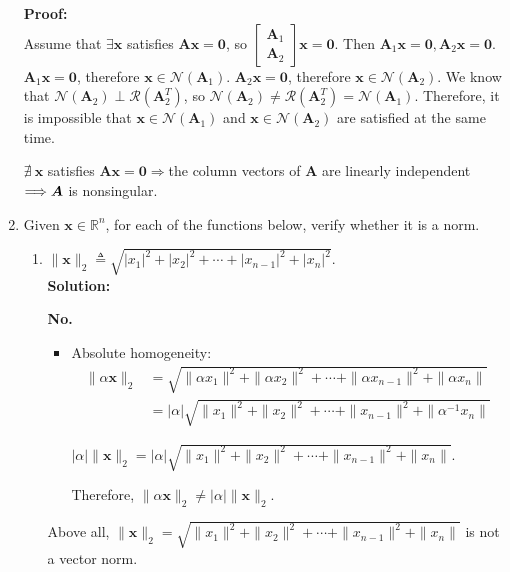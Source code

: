 \documentclass[12pt, letterpaper, onecolumn]{article}
\begin{document}
\begin{enumerate}[start=2]
		\textbf{Proof:}\\
		Assume that $\exists\bm{x}$ satisfies $\bm{A}\bm{x}=\bm{0}$, so 
		$\begin{bmatrix}
            \bm{A}_{1} \\ \bm{A}_{2}
		\end{bmatrix} \bm{x}=\bm{0}$.
		Then $\bm{A}_{1}\bm{x}=\bm{0},\bm{A}_{2}\bm{x}=\bm{0}$.
		$\bm{A}_{1}\bm{x}=\bm{0} $, therefore $\bm{x}\in\mathcal{N}(\bm{A}_{1})$. $\bm{A}_{2}\bm{x}=\bm{0} $, therefore $\bm{x}\in\mathcal{N}(\bm{A}_{2})$. We know that $\mathcal{N}(\bm{A}_{2}) \perp \mathcal{R}(\bm{A}_2^T)$, so $\mathcal{N}(\bm{A}_{2}) \neq \mathcal{R}(\bm{A}_2^T) = \mathcal{N}(\bm{A}_{1})$. Therefore, it is impossible that $\bm{x}\in\mathcal{N}(\bm{A}_{1})$ and $\bm{x}\in\mathcal{N}(\bm{A}_{2})$ are satisfied at the same time.

		$\nexists\ \bm{x}$ satisfies $\bm{A}\bm{x}=\bm{0}\Longrightarrow $the column vectors of $\bm{A}$ are linearly independent $\Longrightarrow\\\bm{A}$ is nonsingular.

		\item Given $\bm{x}\in\mathbb{R}^n$, for each of the functions below, verify whether it is a norm.%
		\begin{enumerate}%
			\item $\|\bm{x}\|_2\triangleq\sqrt{|x_1|^2+|x_2|^2+\cdots+|x_{n-1}|^2+|x_n|^2}$.\\%
			\textbf{Solution:}

			\textbf{No.}

			\begin{itemize}
				\item Absolute homogeneity:
				\begin{align*} %
					\|\alpha\bm{x}\|_{2} 
					&=\sqrt{\|\alpha x_{1}\|^{2}+\|\alpha x_{2}\|^{2}+\cdots+\|\alpha x_{n-1}\|^{2}+\|\alpha x_{n}\|}\\ 
					&=|\alpha|\sqrt{\|x_{1}\|^{2}+\|x_{2}\|^{2}+\cdots+\|x_{n-1}\|^{2}+\|\alpha^{-1}x_{n}\|}
				\end{align*}

				$|\alpha|\|\bm{x}\|_{2}=|\alpha|\sqrt{\|x_{1}\|^{2}+\|x_{2}\|^{2}+\cdots+\|x_{n-1}\|^{2}+\|x_{n}\|}$.

				Therefore, $\|\alpha\bm{x}\|_{2}\neq|\alpha|\|\bm{x}\|_{2}$.
			\end{itemize}
			Above all, $\|\bm{x}\|_{2}=\sqrt{\|x_{1}\|^{2}+\|x_{2}\|^{2}+\cdots+\|x_{n-1}\|^{2}+\|x_{n}\|}$ is not a vector norm.


\end{enumerate}
\end{enumerate}
\end{document}
